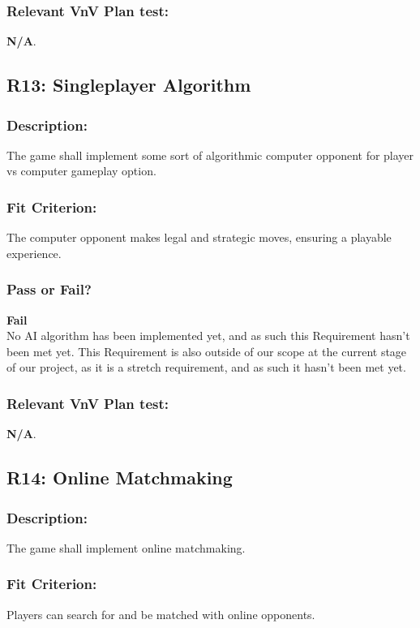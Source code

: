 \documentclass[12pt, titlepage]{article}
\begin{document}
\subsubsection{Relevant VnV Plan test: } \textbf{N/A}. 

\subsection{R13: Singleplayer Algorithm} 

\subsubsection{Description:} The game shall implement some sort of algorithmic computer opponent for  player vs computer gameplay option.

\subsubsection{Fit Criterion:} The computer opponent makes legal and strategic moves, ensuring a playable experience.

\subsubsection{Pass or Fail?} 

 \noindent \textbf{Fail}\\
 
 \noindent No AI algorithm has been implemented yet, and as such this Requirement hasn't been met yet. This Requirement is also outside of our scope at the current stage of our project, as it is a stretch requirement, and as such it hasn't been met yet.

\subsubsection{Relevant VnV Plan test: } \textbf{N/A}.

\subsection{R14: Online Matchmaking} 

\subsubsection{Description:}The game shall implement online matchmaking.

\subsubsection{Fit Criterion:}Players can search for and be matched with online opponents.
\end{document}
